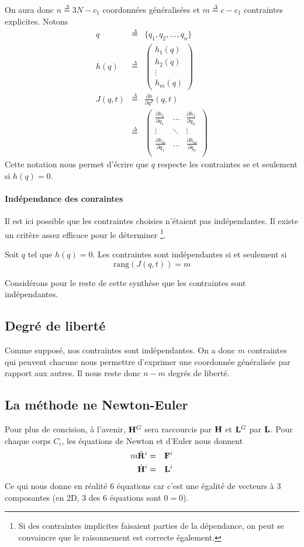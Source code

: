 \documentclass[11pt,a4paper]{article}
\newcommand\fv[1]{{\bf #1}} %
\newcommand\fvdd[1]{\ddot{\bf #1}} %
\newcommand\eqdef{\stackrel{\Delta}{=}}
\newcommand\st{{\bf L}}
\newcommand\am{{\bf H}}
\newcommand\amd{\dot{\am}}
\newcommand\xgdd{\ensuremath{\fvdd{R}}}
\begin{document}
On aura donc $n \eqdef 3N - c_1$ coordonnées généralisées et $m \eqdef c - c_1$ contraintes explicites.
Notons
\begin{eqnarray*}
	q & \eqdef & \{q_1, q_2, \ldots, q_n\}\\
	h(q) & \eqdef & \begin{pmatrix}h_1(q)\\h_2(q)\\\vdots\\h_m(q)\end{pmatrix}\\
	J(q, t) & \eqdef & \frac{\partial h}{\partial q^T}(q, t)\\
	& \eqdef &
	\begin{pmatrix}
		\frac{\partial h_1}{\partial q_1} & \ldots & \frac{\partial h_1}{\partial q_n}\\
		\vdots & \ddots & \vdots\\
		\frac{\partial h_m}{\partial q_1} & \ldots & \frac{\partial h_m}{\partial q_n}\\
	\end{pmatrix}
\end{eqnarray*}
Cette notation nous permet d'écrire que $q$ respecte les contraintes se et seulement si $h(q) = 0$.

\paragraph{Indépendance des conraintes}
Il est ici possible que les contraintes choisies n'étaient pas indépendantes.
Il existe un critère assez efficace pour le déterminer
\footnote{Si des contraintes implicites faisaient parties de la dépendance, on peut se convaincre que le raisonnement est correcte également.}.

Soit $q$ tel que $h(q) = 0$.
Les contraintes sont indépendantes si et seulement si
\[ \mathrm{rang} (J(q, t)) = m \]

Considérons pour le reste de cette synthèse que les contraintes sont indépendantes.

\subsection{Degré de liberté}
Comme supposé, nos contraintes sont indépendantes.
On a donc $m$ contraintes qui peuvent chacune nous permettre d'exprimer une coordonnée généralisée par rapport aux autres.
Il nous reste donc $n - m$ degrés de liberté.

\subsection{La méthode ne Newton-Euler}
Pour plus de concision, à l'avenir, $\am^G$ sera raccourcis par $\am$ et $\st^G$ par $\st$.
Pour chaque corps $C_i$, les équations de Newton et d'Euler nous donnent
\begin{eqnarray*}
	m\xgdd^i &=& \fv{F}^i\\
	\amd^i &=& \st^i
\end{eqnarray*}
Ce qui nous donne en réalité 6 équations car c'est une égalité de vecteurs à 3 composantes (en 2D, 3 des 6 équations sont $0 = 0$).
\end{document}
